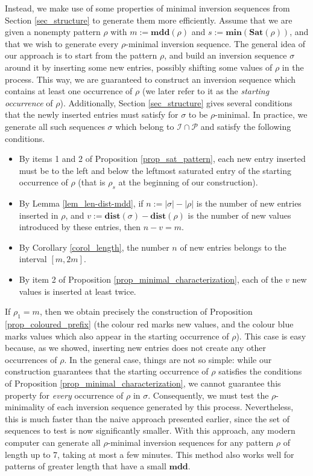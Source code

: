 \documentclass[a4paper,11pt]{article}
\theoremstyle{definition}
\theoremstyle{remark}
\newcommand{\I}{\mathcal{I}}
\renewcommand{\P}{\mathcal{P}}
\renewcommand{\min}{\mathbf{min}}
\newcommand{\mdd}{\mathbf{mdd}}
\newcommand{\Sat}{\mathbf{Sat}}
\newcommand{\dist}{\mathbf{dist}}
\begin{document}
Instead, we make use of some properties of minimal inversion sequences from Section \ref{sec_structure} to generate them more efficiently.
Assume that we are given a nonempty pattern $\rho$ with $m := \mdd(\rho)$ and $s := \min(\Sat(\rho))$, and that we wish to generate every $\rho$-minimal inversion sequence.
The general idea of our approach is to start from the pattern $\rho$, and build an inversion sequence $\sigma$ around it by inserting some new entries, possibly shifting some values of $\rho$ in the process.
This way, we are guaranteed to construct an inversion sequence which contains at least one occurrence of $\rho$ (we later refer to it as the \emph{starting occurrence} of $\rho$).
Additionally, Section \ref{sec_structure} gives several conditions that the newly inserted entries must satisfy for $\sigma$ to be $\rho$-minimal. In practice, we generate all such sequences $\sigma$ which belong to $\I \cap \P$ and satisfy the following conditions.
\begin{itemize}
    \item By items 1 and 2 of Proposition \ref{prop_sat_pattern}, each new entry inserted must be to the left and below the leftmost saturated entry of the starting occurrence of $\rho$ (that is $\rho_s$ at the beginning of our construction).
    \item By Lemma \ref{lem_len-dist-mdd}, if $n := |\sigma| - |\rho|$ is the number of new entries inserted in $\rho$, and $v := \dist(\sigma) - \dist(\rho)$ is the number of new values introduced by these entries, then $n-v = m$.
    \item By Corollary \ref{corol_length}, the number $n$ of new entries belongs to the interval $[m,2m]$.
    \item By item 2 of Proposition \ref{prop_minimal_characterization}, each of the $v$ new values is inserted at least twice.
\end{itemize}
If $\rho_1 = m$, then we obtain precisely the construction of Proposition \ref{prop_coloured_prefix} (the colour red marks new values, and the colour blue marks values which also appear in the starting occurrence of $\rho$).
This case is easy because, as we showed, inserting new entries does not create any other occurrences of $\rho$. In the general case, things are not so simple: while our construction guarantees that the starting occurrence of $\rho$ satisfies the conditions of Proposition \ref{prop_minimal_characterization}, we cannot guarantee this property for \emph{every} occurrence of $\rho$ in $\sigma$.
Consequently, we must test the $\rho$-minimality of each inversion sequence generated by this process. Nevertheless, this is much faster than the naive approach presented earlier, since the set of sequences to test is now significantly smaller. With this approach, any modern computer can generate all $\rho$-minimal inversion sequences for any pattern $\rho$ of length up to 7, taking at most a few minutes. This method also works well for patterns of greater length that have a small $\mdd$.
\end{document}
